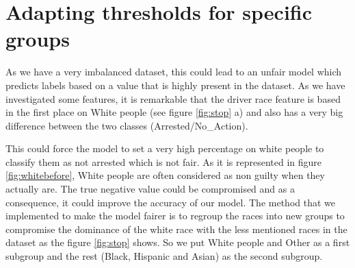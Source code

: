 \documentclass[doctype=studienarbeit,lang=english,BCOR=15mm,biblatex]{ldvbook}
\begin{document}
\section{Adapting thresholds for specific  groups}
As we have a very imbalanced dataset, this could lead to an unfair model which predicts labels based on a value that is highly present in the dataset. As we have investigated some features, it is remarkable that the driver race feature is based in the first place on White people (see figure \ref{fig:stop} a) and also has a very big difference between the two classes (Arrested/No\_Action).

This could force the model to set a very high percentage on white people to classify them as not arrested which is not fair. As it is represented in figure \ref{fig:whitebefore}, White people are often considered as non guilty when they actually are. The true negative value could be compromised and as a consequence, it could improve the accuracy of our model.
The method that we implemented to make the model fairer is to regroup the races into new groups to compromise the dominance of the white race with the less mentioned races in the dataset as the figure \ref{fig:stop} shows.
So we put White people and Other as a first subgroup and the rest (Black, Hispanic and Asian) as the second subgroup. 
\end{document}
